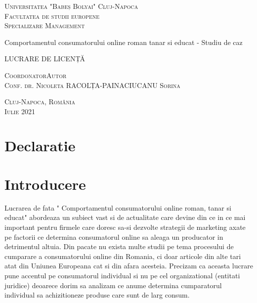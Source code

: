 \documentclass[a4paper, 12pt]{article}
\begin{document}
\begin{titlepage}
	\begin{center}
		\vspace{0.5cm}
		\LARGE \textsc{Universitatea "Babeș Bolyai"}
		\LARGE \textsc{Cluj-Napoca}
		\\
		\vspace{0.5cm}
		\Large \textsc{Facultatea de studii europene}
		\\
		\Large \textsc{Specializare Management}
		
		
		\vspace{1.5cm}
		
		\Huge Comportamentul consumatorului online roman tanar si educat - Studiu de caz
		\\
		\bigskip
	

		\vspace{0.5cm}		
		\Large LUCRARE DE LICENȚĂ
		
		\vfill
		
		\Large
		\textsc{Coordonator}\hfill \textsc{Autor}
		\\
		\large
		\textsc{Conf. dr. Nicoleta RACOLȚA-PAINA}\hfill\textsc{CIUCANU Sorina}
		
		\vspace{1.5cm}
		\textsc{Cluj-Napoca, România}\\
		\textsc{Iulie 2021}
		
	\end{center}
\end{titlepage}
\restoregeometry

\tableofcontents

\newpage
\listoffigures

\newpage

\section*{Declaratie}
\newpage

\section*{Introducere}
	
	\quad\quad Lucrarea de fata " Comportamentul consumatorului online roman, tanar si educat" abordeaza un subiect vast si de actualitate care devine din ce in ce mai important pentru firmele care doresc sa-si dezvolte strategii de marketing axate pe factorii ce determina consumatorul online sa aleaga un producator in detrimentul altuia. Din pacate nu exista multe studii pe tema procesului de cumparare a consumatorului online din Romania, ci doar articole din alte tari atat din Uniunea Europeana cat si din afara acesteia. Precizam ca aceasta lucrare pune accentul pe consumatorul  individual si nu pe cel organizational (entitati juridice) deoarece dorim sa analizam ce anume determina cumparatorul individual sa achizitioneze produse care sunt de larg consum.
	
\end{document}
